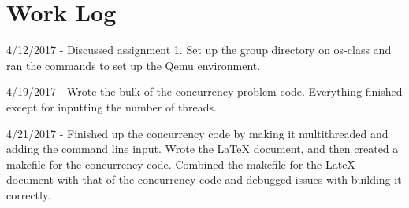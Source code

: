 \documentclass[10pt,onecolumn,journal,draftclsnofoot]{IEEEtran}
\begin{document}
\section{Work Log}
\par
4/12/2017 - Discussed assignment 1. Set up the group directory on os-class and ran the commands to set up the Qemu environment.
\par
4/19/2017 - Wrote the bulk of the concurrency problem code. Everything finished except for inputting the number of threads.
\par
4/21/2017 - Finished up the concurrency code by making it multithreaded and adding the command line input. Wrote the LaTeX document, and then created a makefile for the concurrency code. Combined the makefile for the LateX document with that of the concurrency code and debugged issues with building it correctly. 
\end{document}
